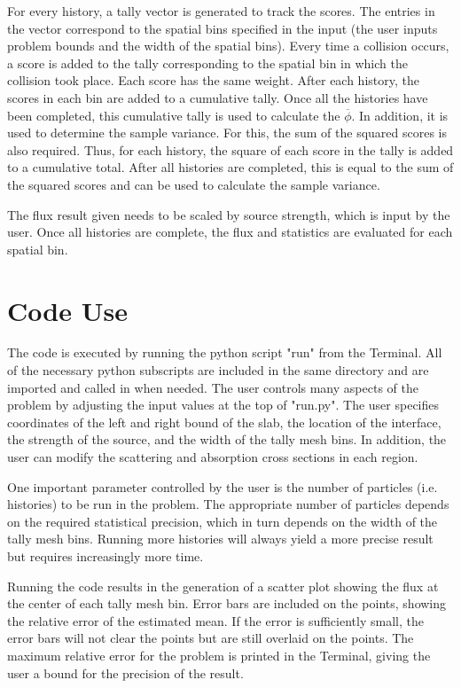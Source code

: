 \documentclass[11pt, oneside]{article}   	%
\newcommand*\mean[1]{\overline{#1}}				%
\begin{document}
For every history, a tally vector is generated to track the scores. The entries in the vector correspond to the spatial bins specified in the input (the user inputs problem bounds and the width of the spatial bins). Every time a collision occurs, a score is added to the tally corresponding to the spatial bin in which the collision took place. Each score has the same weight. After each history, the scores in each bin are added to a cumulative tally. Once all the histories have been completed, this cumulative tally is used to calculate the $\mean{\phi}$. In addition, it is used to determine the sample variance. For this, the sum of the squared scores is also required. Thus, for each history, the square of each score in the tally is added to a cumulative total. After all histories are completed, this is equal to the sum of the squared scores and can be used to calculate the sample variance.

The flux result given needs to be scaled by source strength, which is input by the user. Once all histories are complete, the flux and statistics are evaluated for each spatial bin.

\section{Code Use}

The code is executed by running the python script "run" from the Terminal. All of the necessary python subscripts are included in the same directory and are imported and called in when needed. The user controls many aspects of the problem by adjusting the input values at the top of "run.py". The user specifies coordinates of the left and right bound of the slab, the location of the interface, the strength of the source, and the width of the tally mesh bins. In addition, the user can modify the scattering and absorption cross sections in each region.

One important parameter controlled by the user is the number of particles (i.e. histories) to be run in the problem. The appropriate number of particles depends on the required statistical precision, which in turn depends on the width of the tally mesh bins. Running more histories will always yield a more precise result but requires increasingly more time.

Running the code results in the generation of a scatter plot showing the flux at the center of each tally mesh bin. Error bars are included on the points, showing the relative error of the estimated mean. If the error is sufficiently small, the error bars will not clear the points but are still overlaid on the points. The maximum relative error for the problem is printed in the Terminal, giving the user a bound for the precision of the result.
\end{document}
